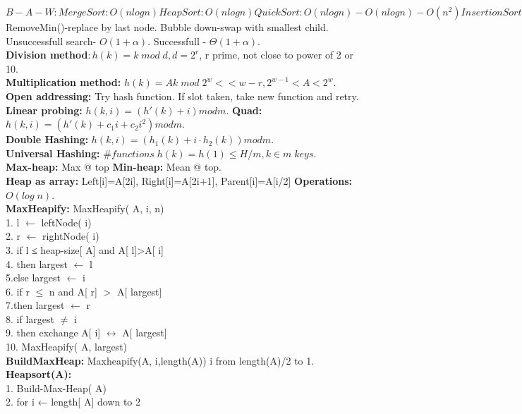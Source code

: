 \documentclass[paper=a4, fontsize=11pt]{scrartcl} %
\begin{document}
$B-A-W :MergeSort: O(nlogn) HeapSort: O(nlogn) QuickSort: O(nlogn)-O(nlogn)-O(n^2) InsertionSort: O(n)-O(n^2)-O(n^2) BubbleSort: O(n)-O(n^2)-O(n^2)$\\
RemoveMin()-replace by last node. Bubble down-swap with smallest child.\\
Unsuccessfull search- $O(1+\alpha)$. Successfull - $\Theta(1+\alpha)$.\\
\textbf{Division method}$: h(k)=k \; mod\; d, d=2^r$, r prime, not close to power of 2 or 10.\\
\textbf{Multiplication method:} $h(k)=Ak \; mod \; 2^w << w -r, 2^{w-1} < A < 2^w$.\\
\textbf{Open addressing:} Try hash function. If slot taken, take new function and retry.\\
\textbf{Linear probing:} $h ( k, i ) = ( h '( k) + i ) mod m$. \textbf{Quad: } $h ( k, i ) = ( h '( k) + c_1i + c_2i^2 ) mod m$.\\
\textbf{Double Hashing: }$h ( k, i ) = ( h_1( k) + i ⋅ h_2( k)) mod m$.\\
\textbf{Universal Hashing: }$\# functions \; h(k)=h(1) \leq H/m, k \in m \; keys$.\\
\textbf{Max-heap:} Max @ top \textbf{Min-heap:} Mean @ top.\\
\textbf{Heap as array: } Left[i]=A[2i], Right[i]=A[2i+1], Parent[i]=A[i/2] \textbf{Operations: }$O(log \; n)$.\\
\textbf{MaxHeapify:} MaxHeapify( A, i, n)\\
1. l $\leftarrow$ leftNode( i)\\
2. r $\leftarrow$ rightNode( i)\\
3. if l ≤ heap-size[ A] and A[ l]>A[ i]\\
4.	\indent then largest $\leftarrow$ l\\
5.\indent	 else largest $\leftarrow$ i\\
6.  if r $\leq$ n and A[ r] $>$ A[ largest]\\
7.\indent	 then largest $\leftarrow$ r\\
8. if largest $\neq$ i\\
9. \indent then exchange A[ i] $\leftrightarrow$ A[ largest]\\
10. \indent MaxHeapify( A, largest)\\
\textbf{BuildMaxHeap:} Maxheapify(A, i,length(A)) i from length(A)/2 to 1.
\textbf{Heapsort(A):}\\
1. Build-Max-Heap( A)\\
2. for i ← length[ A] down to 2\\
\end{document}
